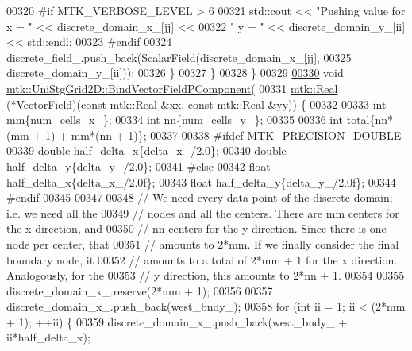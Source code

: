 \begin{DoxyCode}
00320 \textcolor{preprocessor}{      #if MTK\_VERBOSE\_LEVEL > 6}
00321       std::cout << \textcolor{stringliteral}{"Pushing value for x = "} << discrete\_domain\_x\_[jj] <<
00322         \textcolor{stringliteral}{" y = "} << discrete\_domain\_y\_[ii] << std::endl;
00323 \textcolor{preprocessor}{      #endif}
00324       discrete\_field\_.push\_back(ScalarField(discrete\_domain\_x\_[jj],
00325                                             discrete\_domain\_y\_[ii]));
00326     \}
00327   \}
00328 \}
00329 
\hypertarget{mtk__uni__stg__grid__2d_8cc_source_l00330}{}\hyperlink{classmtk_1_1UniStgGrid2D_a47b92d03ef5ed2b1ed28091a424f8f52}{00330} \textcolor{keywordtype}{void} \hyperlink{classmtk_1_1UniStgGrid2D_a47b92d03ef5ed2b1ed28091a424f8f52}{mtk::UniStgGrid2D::BindVectorFieldPComponent}(
00331   \hyperlink{group__c01-roots_gac080bbbf5cbb5502c9f00405f894857d}{mtk::Real} (*VectorField)(\textcolor{keyword}{const} \hyperlink{group__c01-roots_gac080bbbf5cbb5502c9f00405f894857d}{mtk::Real} &xx, \textcolor{keyword}{const} 
      \hyperlink{group__c01-roots_gac080bbbf5cbb5502c9f00405f894857d}{mtk::Real} &yy)) \{
00332 
00333   \textcolor{keywordtype}{int} mm\{num\_cells\_x\_\};
00334   \textcolor{keywordtype}{int} nn\{num\_cells\_y\_\};
00335 
00336   \textcolor{keywordtype}{int} total\{nn*(mm + 1) + mm*(nn + 1)\};
00337 
00338 \textcolor{preprocessor}{  #ifdef MTK\_PRECISION\_DOUBLE}
00339   \textcolor{keywordtype}{double} half\_delta\_x\{delta\_x\_/2.0\};
00340   \textcolor{keywordtype}{double} half\_delta\_y\{delta\_y\_/2.0\};
00341 \textcolor{preprocessor}{  #else}
00342   \textcolor{keywordtype}{float} half\_delta\_x\{delta\_x\_/2.0f\};
00343   \textcolor{keywordtype}{float} half\_delta\_y\{delta\_y\_/2.0f\};
00344 \textcolor{preprocessor}{  #endif}
00345 
00347 
00348   \textcolor{comment}{// We need every data point of the discrete domain; i.e. we need all the}
00349   \textcolor{comment}{// nodes and all the centers. There are mm centers for the x direction, and}
00350   \textcolor{comment}{// nn centers for the y direction. Since there is one node per center, that}
00351   \textcolor{comment}{// amounts to 2*mm. If we finally consider the final boundary node, it}
00352   \textcolor{comment}{// amounts to a total of 2*mm + 1 for the x direction. Analogously, for the}
00353   \textcolor{comment}{// y direction, this amounts to 2*nn + 1.}
00354 
00355   discrete\_domain\_x\_.reserve(2*mm + 1);
00356 
00357   discrete\_domain\_x\_.push\_back(west\_bndy\_);
00358   \textcolor{keywordflow}{for} (\textcolor{keywordtype}{int} ii = 1; ii < (2*mm + 1); ++ii) \{
00359     discrete\_domain\_x\_.push\_back(west\_bndy\_ + ii*half\_delta\_x);

\end{DoxyCode}
